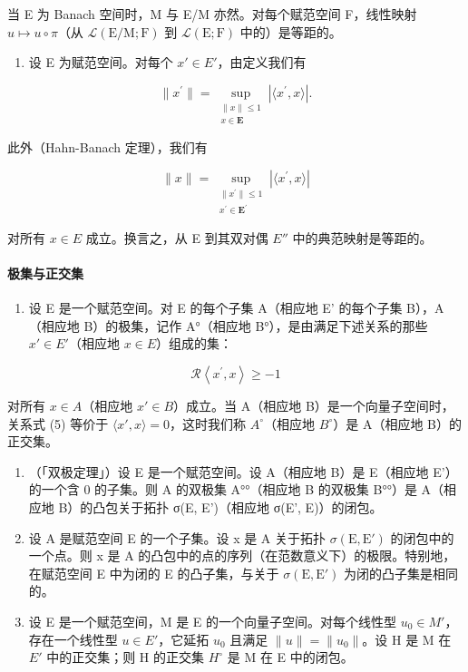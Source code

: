 当 E 为 Banach 空间时，M 与 E/M 亦然。对每个赋范空间 F，线性映射 \(u \mapsto u \circ \pi\)（从 \(\mathcal{L}(\mathrm{E}/\mathrm{M}; \mathrm{F})\) 到 \(\mathcal{L}(\mathrm{E}; \mathrm{F})\) 中的）是等距的。

\begin{enumerate}
\def\labelenumi{\arabic{enumi})}
\setcounter{enumi}{3}
\tightlist
\item
  设 E 为赋范空间。对每个 \(x' \in E'\)，由定义我们有
\end{enumerate}

\[
\| x^{\prime}\| = \sup_{\substack{\| x\| \leqslant 1\\ x\in \mathbf{E}}}\left|\langle x^{\prime},x\rangle \right|.\tag{3}
\]

此外（Hahn-Banach 定理），我们有

\[
\| x \| = \sup_{\substack{\| x^{\prime}\| \leqslant 1\\ x^{\prime}\in \mathbf{E}^{\prime}}}\left|\langle x^{\prime},x\rangle \right|\tag{4}
\]

对所有 \(x \in E\) 成立。换言之，从 E 到其双对偶 \(E''\) 中的典范映射是等距的。
\relax{}
\paragraph{极集与正交集}

\begin{enumerate}
\def\labelenumi{\arabic{enumi})}
\setcounter{enumi}{4}
\tightlist
\item
  设 E 是一个赋范空间。对 E 的每个子集 A（相应地 E' 的每个子集 B），A（相应地 B）的极集，记作 A°（相应地 B°），是由满足下述关系的那些 \(x' \in E'\)（相应地 \(x \in E\)）组成的集：
\end{enumerate}

\[
\mathcal {R} \left<   x ^ {\prime}, x \right> \geqslant - 1\tag{5}
\]

对所有 \(x \in A\)（相应地 \(x' \in B\)）成立。当 A（相应地 B）是一个向量子空间时，关系式 (5) 等价于 \(\langle x', x \rangle = 0\)，这时我们称 \(A^{\circ}\)（相应地 \(B^{\circ}\)）是 A（相应地 B）的正交集。

\begin{enumerate}
\def\labelenumi{\arabic{enumi})}
\setcounter{enumi}{5}
\item
  （「双极定理」）设 E 是一个赋范空间。设 A（相应地 B）是 E（相应地 E'）的一个含 0 的子集。则 A 的双极集 A°°（相应地 B 的双极集 B°°）是 A（相应地 B）的凸包关于拓扑 σ(E, E')（相应地 σ(E', E)）的闭包。
\item
  设 A 是赋范空间 E 的一个子集。设 x 是 A 关于拓扑 \(\sigma(\mathrm{E}, \mathrm{E}')\) 的闭包中的一个点。则 x 是 A 的凸包中的点的序列（在范数意义下）的极限。特别地，在赋范空间 E 中为闭的 E 的凸子集，与关于 \(\sigma(\mathrm{E}, \mathrm{E}')\) 为闭的凸子集是相同的。
\item
   设 E 是一个赋范空间，M 是 E 的一个向量子空间。对每个线性型 \(u_{0} \in M'\)，存在一个线性型 \(u \in E'\)，它延拓 \(u_{0}\) 且满足 \(\|u\| = \|u_{0}\|\)。设 H 是 M 在 \(E'\) 中的正交集；则 H 的正交集 \(H^{\circ}\) 是 M 在 E 中的闭包。
\end{enumerate}

